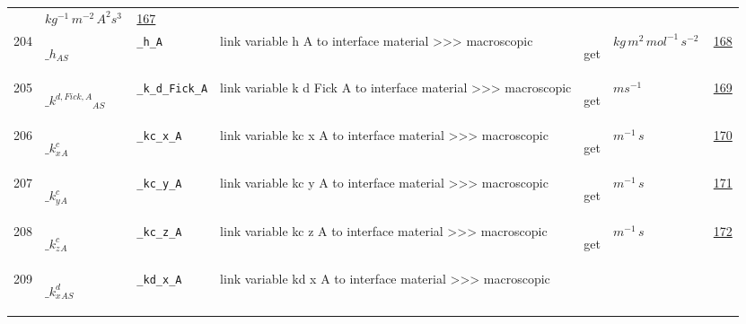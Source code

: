\begin{longtable}{|p{1cm}|p{2.5cm}|p{4.5cm}|p{8cm}|p{3.0cm}|p{3cm}|p{1cm}|}
             & $ kg^{-1} \,m^{-2} \,A^{2} s^{3} \, $
             &                 \hyperlink{"e:167"}{ 167 }
                 \\
            204
             & \hypertarget{"v:204"}{ $ {{\_h}}{_{{A S}}} $}
             & \verb|_h_A|
             & link variable h A to interface material >>> macroscopic
             & \begin{lay}get \end{lay}
             & $ kg \,m^{2} \,mol^{-1} \,s^{-2} \, $
             &                 \hyperlink{"e:168"}{ 168 }
                 \\
            205
             & \hypertarget{"v:205"}{ $ {{\_k^{d,Fick,A}}}{_{{A S}}} $}
             & \verb|_k_d_Fick_A|
             & link variable k d Fick A to interface material >>> macroscopic
             & \begin{lay}get \end{lay}
             & $ m s^{-1} \, $
             &                 \hyperlink{"e:169"}{ 169 }
                 \\
            206
             & \hypertarget{"v:206"}{ $ {{\_k^c_x}}{_{A}} $}
             & \verb|_kc_x_A|
             & link variable kc x A to interface material >>> macroscopic
             & \begin{lay}get \end{lay}
             & $ m^{-1} \,s \, $
             &                 \hyperlink{"e:170"}{ 170 }
                 \\
            207
             & \hypertarget{"v:207"}{ $ {{\_k^c_y}}{_{A}} $}
             & \verb|_kc_y_A|
             & link variable kc y A to interface material >>> macroscopic
             & \begin{lay}get \end{lay}
             & $ m^{-1} \,s \, $
             &                 \hyperlink{"e:171"}{ 171 }
                 \\
            208
             & \hypertarget{"v:208"}{ $ {{\_k^c_z}}{_{A}} $}
             & \verb|_kc_z_A|
             & link variable kc z A to interface material >>> macroscopic
             & \begin{lay}get \end{lay}
             & $ m^{-1} \,s \, $
             &                 \hyperlink{"e:172"}{ 172 }
                 \\
            209
             & \hypertarget{"v:209"}{ $ {{\_k^d_x}}{_{{A S}}} $}
             & \verb|_kd_x_A|
             & link variable kd x A to interface material >>> macroscopic

\end{longtable}
